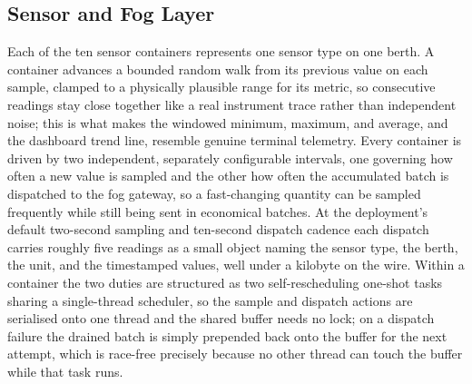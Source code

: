 \documentclass[conference]{IEEEtran}
\begin{document}
\subsection{Sensor and Fog Layer}

Each of the ten sensor containers represents one sensor type on one berth. A container advances a bounded random walk from its previous value on each sample, clamped to a physically plausible range for its metric, so consecutive readings stay close together like a real instrument trace rather than independent noise; this is what makes the windowed minimum, maximum, and average, and the dashboard trend line, resemble genuine terminal telemetry. Every container is driven by two independent, separately configurable intervals, one governing how often a new value is sampled and the other how often the accumulated batch is dispatched to the fog gateway, so a fast-changing quantity can be sampled frequently while still being sent in economical batches. At the deployment's default two-second sampling and ten-second dispatch cadence each dispatch carries roughly five readings as a small object naming the sensor type, the berth, the unit, and the timestamped values, well under a kilobyte on the wire. Within a container the two duties are structured as two self-rescheduling one-shot tasks sharing a single-thread scheduler, so the sample and dispatch actions are serialised onto one thread and the shared buffer needs no lock; on a dispatch failure the drained batch is simply prepended back onto the buffer for the next attempt, which is race-free precisely because no other thread can touch the buffer while that task runs.
\end{document}
